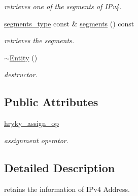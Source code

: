 \begin{DoxyCompactItemize}
\begin{DoxyCompactList}\small\item\em retrieves one of the segments of I\-Pv4. \end{DoxyCompactList}\item 
\hypertarget{classhryky_1_1ip_1_1v4_1_1_entity_a334a3d0b58d5d0205898fec5b8ee5b65}{\hyperlink{classhryky_1_1_array}{segments\-\_\-type} const \& \hyperlink{classhryky_1_1ip_1_1v4_1_1_entity_a334a3d0b58d5d0205898fec5b8ee5b65}{segments} () const }\label{classhryky_1_1ip_1_1v4_1_1_entity_a334a3d0b58d5d0205898fec5b8ee5b65}

\begin{DoxyCompactList}\small\item\em retrieves the segments. \end{DoxyCompactList}\item 
\hypertarget{classhryky_1_1ip_1_1v4_1_1_entity_aa46921a3bd7100eb08b398ddd80f12c0}{\hyperlink{classhryky_1_1ip_1_1v4_1_1_entity_aa46921a3bd7100eb08b398ddd80f12c0}{$\sim$\-Entity} ()}\label{classhryky_1_1ip_1_1v4_1_1_entity_aa46921a3bd7100eb08b398ddd80f12c0}

\begin{DoxyCompactList}\small\item\em destructor. \end{DoxyCompactList}\end{DoxyCompactItemize}
\subsection*{Public Attributes}
\begin{DoxyCompactItemize}
\item 
\hypertarget{classhryky_1_1ip_1_1v4_1_1_entity_a9d26c9ef279ddf83b451ceb2fccfb408}{\hyperlink{classhryky_1_1ip_1_1v4_1_1_entity_a9d26c9ef279ddf83b451ceb2fccfb408}{hryky\-\_\-assign\-\_\-op}}\label{classhryky_1_1ip_1_1v4_1_1_entity_a9d26c9ef279ddf83b451ceb2fccfb408}

\begin{DoxyCompactList}\small\item\em assignment operator. \end{DoxyCompactList}\end{DoxyCompactItemize}


\subsection{Detailed Description}
retains the information of I\-Pv4 Address. 

